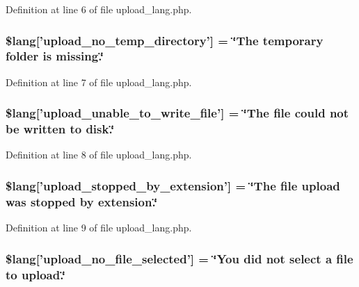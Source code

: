 Definition at line 6 of file upload\-\_\-lang.\-php.

\hypertarget{upload__lang_8php_ac7144f4992346816875bac28488ef715}{
\subsubsection[{\$lang}]{\setlength{\rightskip}{0pt plus 5cm}\$lang\mbox{[}'upload\-\_\-no\-\_\-temp\-\_\-directory'\mbox{]} = \char`\"{}The temporary folder is missing.\char`\"{}}}\label{upload__lang_8php_ac7144f4992346816875bac28488ef715}


Definition at line 7 of file upload\-\_\-lang.\-php.

\hypertarget{upload__lang_8php_a620b622468d4e7781fed6316440c85e7}{
\subsubsection[{\$lang}]{\setlength{\rightskip}{0pt plus 5cm}\$lang\mbox{[}'upload\-\_\-unable\-\_\-to\-\_\-write\-\_\-file'\mbox{]} = \char`\"{}The file could {\bf not} be written {\bf to} disk.\char`\"{}}}\label{upload__lang_8php_a620b622468d4e7781fed6316440c85e7}


Definition at line 8 of file upload\-\_\-lang.\-php.

\hypertarget{upload__lang_8php_ae97257deea3dddb33be4bbc6510a464b}{
\subsubsection[{\$lang}]{\setlength{\rightskip}{0pt plus 5cm}\$lang\mbox{[}'upload\-\_\-stopped\-\_\-by\-\_\-extension'\mbox{]} = \char`\"{}The file upload was stopped by extension.\char`\"{}}}\label{upload__lang_8php_ae97257deea3dddb33be4bbc6510a464b}


Definition at line 9 of file upload\-\_\-lang.\-php.

\hypertarget{upload__lang_8php_a88d8e8f9b879d1c25e6c089f3d3b5a30}{
\subsubsection[{\$lang}]{\setlength{\rightskip}{0pt plus 5cm}\$lang\mbox{[}'upload\-\_\-no\-\_\-file\-\_\-selected'\mbox{]} = \char`\"{}You did {\bf not} select {\bf a} file {\bf to} upload.\char`\"{}}}\label{upload__lang_8php_a88d8e8f9b879d1c25e6c089f3d3b5a30}


